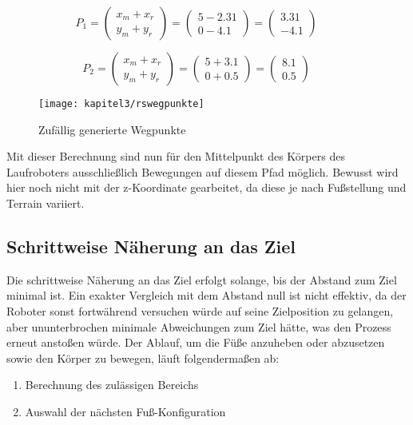 \begin{equation}
  P_1=\left(\begin{array}{c} x_m + x_r \\ y_m + y_r \end{array}\right)=\left(\begin{array}{c} 5 - 2.31 \\ 0 - 4.1 \end{array}\right)=\left(\begin{array}{c} 3.31 \\ -4.1 \end{array}\right) \qquad
\label{RandomSamplingWegpunkteP1}
\end{equation}

\begin{equation}
  P_2=\left(\begin{array}{c} x_m + x_r \\ y_m + y_r \end{array}\right)=\left(\begin{array}{c} 5 + 3.1 \\ 0 + 0.5 \end{array}\right)=\left(\begin{array}{c} 8.1 \\ 0.5 \end{array}\right) \qquad
\label{RandomSamplingWegpunkteP2}
\end{equation}

\begin{figure}[t!]
  \centering
  \texttt{[image: kapitel3/rswegpunkte]}
  \caption{Zufällig generierte Wegpunkte}
  \label{Kap3:RSWegpunkte}
\end{figure}

Mit dieser Berechnung sind nun für den Mittelpunkt des Körpers des Laufroboters ausschließlich Bewegungen auf diesem Pfad möglich. Bewusst wird hier noch nicht mit der z-Koordinate gearbeitet, da diese je nach Fußstellung und Terrain variiert.

\subsection{Schrittweise Näherung an das Ziel}

Die schrittweise Näherung an das Ziel erfolgt solange, bis der Abstand zum Ziel minimal ist. Ein exakter Vergleich mit dem Abstand null ist nicht effektiv, da der Roboter sonst fortwährend versuchen würde auf seine Zielposition zu gelangen, aber ununterbrochen minimale Abweichungen zum Ziel hätte, was den Prozess erneut anstoßen würde. Der Ablauf, um die Füße anzuheben oder abzusetzen sowie den Körper zu bewegen, läuft folgendermaßen ab:
\begin{enumerate}
  \item Berechnung des zulässigen Bereichs
  \item Auswahl der nächsten Fuß-Konfiguration
\end{enumerate}

